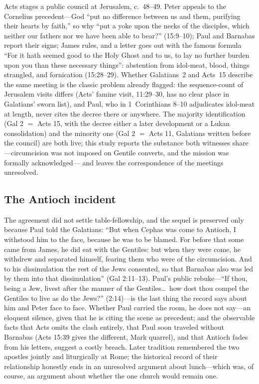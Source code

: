 Acts stages a public council at Jerusalem, c.~48--49. Peter appeals to the
Cornelius precedent---God ``put no difference between us and them,
purifying their hearts by faith,'' so why ``put a yoke upon the necks of
the disciples, which neither our fathers nor we have been able to bear?''
(15:9--10); Paul and Barnabas report their signs; James rules, and a
letter goes out with the famous formula ``For it hath seemed good to the
Holy Ghost and to us, to lay no further burden upon you than these
necessary things'': abstention from idol-meat, blood, things strangled,
and fornication (15:28--29). Whether Galatians~2 and Acts~15 describe the
same meeting is the classic problem already flagged: the sequence-count of
Jerusalem visits differs (Acts' famine visit, 11:29--30, has no clear
place in Galatians' sworn list), and Paul, who in 1~Corinthians 8--10
adjudicates idol-meat at length, never cites the decree there or anywhere.
The majority identification (Gal 2 $=$ Acts 15, with the decree either a
later development or a Lukan consolidation) and the minority one (Gal 2
$=$ Acts 11, Galatians written before the council) are both live; this
study reports the substance both witnesses share---circumcision was not
imposed on Gentile converts, and the mission was formally acknowledged---
and leaves the correspondence of the meetings unresolved.

\subsection{The Antioch incident}

The agreement did not settle table-fellowship, and the sequel is preserved
only because Paul told the Galatians: ``But when Cephas was come to
Antioch, I withstood him to the face, because he was to be blamed. For
before that some came from James, he did eat with the Gentiles: but when
they were come, he withdrew and separated himself, fearing them who were
of the circumcision. And to his dissimulation the rest of the Jews
consented, so that Barnabas also was led by them into that dissimulation''
(Gal 2:11--13). Paul's public rebuke---``If thou, being a Jew, livest
after the manner of the Gentiles\ldots\ how dost thou compel the Gentiles
to live as do the Jews?'' (2:14)---is the last thing the record says about
him and Peter face to face. Whether Paul carried the room, he does not
say---an eloquent silence, given that he is citing the scene as precedent;
and the observable facts that Acts omits the clash entirely, that Paul
soon traveled without Barnabas (Acts 15:39 gives the different, Mark
quarrel), and that Antioch fades from his letters, suggest a costly
breach. Later tradition remembered the two apostles jointly and liturgically
at Rome; the historical record of their relationship honestly ends in an
unresolved argument about lunch---which was, of course, an argument about
whether the one church would remain one.

